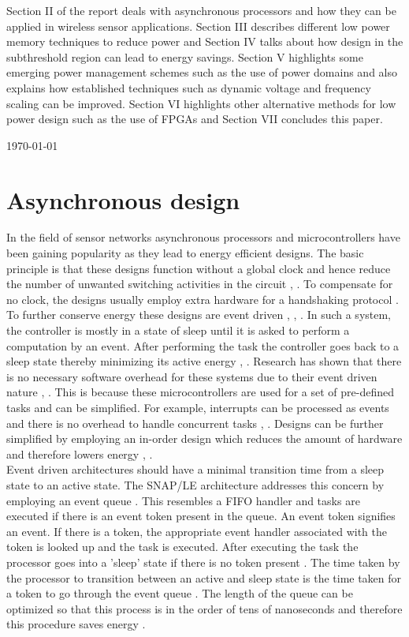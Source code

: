 \documentclass[journal]{IEEEtran}
\begin{document}
Section II of the report deals with asynchronous processors and how they can be applied in wireless sensor applications. Section III describes different low power memory techniques to reduce power and Section IV talks about how design in the subthreshold region can lead to energy savings. Section V highlights some emerging power management schemes such as the use of power domains and also explains how established techniques such as dynamic voltage and frequency scaling can be improved. Section VI highlights other alternative methods for low power design such as the use of FPGAs and Section VII concludes this paper.

 
\hfill \today

\section{Asynchronous design}
In the field of sensor networks asynchronous processors and microcontrollers have been gaining popularity as they lead to energy efficient designs. The basic principle is that these designs function without a global clock and hence reduce the number of unwanted switching activities in the circuit \cite{SNAP/LE}, \cite{LowPower2005}. To compensate for no clock, the designs usually employ extra hardware for a handshaking protocol \cite{SNAP/LE}. To further conserve energy these designs are event driven \cite{SNAP/LE}, \cite{LowPower2005}, \cite{AVR}. In such a system, the controller is mostly in a state of sleep until it is asked to perform a computation by an event. After performing the task the controller goes back to a sleep state thereby minimizing its active energy \cite{SNAP/LE}, \cite{LowPower2005}. Research has shown that there is no necessary software overhead for these systems due to their event driven nature \cite{SNAP/LE}, \cite{LowPower2005}. This is because these microcontrollers are used for a set of pre-defined tasks and can be simplified. For example, interrupts can be processed as events and there is no overhead to handle concurrent tasks \cite{SNAP/LE}, \cite{LowPower2005}. Designs can be further simplified by employing an in-order design which reduces the amount of hardware and therefore lowers energy \cite{LowPower2005}, \cite{SmartDust}. \\

Event driven architectures should have a minimal transition time from a sleep state to an active state. The SNAP/LE architecture addresses this concern by employing an event queue \cite{SNAP/LE}. This resembles a FIFO handler and tasks are executed if there is an event token present in the queue. An event token signifies an event. If there is a token, the appropriate event handler associated with the token is looked up and the task is executed. After executing the task the processor goes into a 'sleep' state if there is no token present \cite{SNAP/LE}. The time taken by the processor to transition between an active and sleep state is the time taken for a token to go through the event queue \cite{SNAP/LE}. The length of the queue can be optimized so that this process is in the order of tens of nanoseconds and therefore this procedure saves energy \cite{SNAP/LE}. \\
\end{document}
